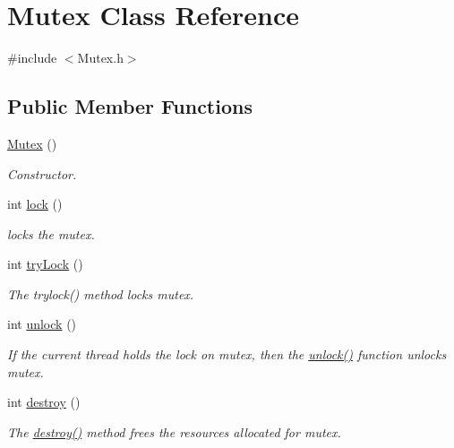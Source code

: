 \hypertarget{class_mutex}{
\section{\-Mutex \-Class \-Reference}
\label{class_mutex}
}


{\ttfamily \#include $<$\-Mutex.\-h$>$}

\subsection*{\-Public \-Member \-Functions}
\begin{DoxyCompactItemize}
\item 
\hyperlink{class_mutex_a593423d868daf926c7b0d63a833ae29a}{\-Mutex} ()
\begin{DoxyCompactList}\small\item\em \-Constructor. \end{DoxyCompactList}\item 
int \hyperlink{class_mutex_ab779f47fd979c9645703b2110ad48a6b}{lock} ()
\begin{DoxyCompactList}\small\item\em locks the mutex. \end{DoxyCompactList}\item 
int \hyperlink{class_mutex_ae259095f6fdebcc45fc85c6f4d52da5a}{try\-Lock} ()
\begin{DoxyCompactList}\small\item\em \-The trylock() method locks mutex. \end{DoxyCompactList}\item 
int \hyperlink{class_mutex_a73ffa1b2f7fef95563bdb83fed8e57ee}{unlock} ()
\begin{DoxyCompactList}\small\item\em \-If the current thread holds the lock on mutex, then the \hyperlink{class_mutex_a73ffa1b2f7fef95563bdb83fed8e57ee}{unlock()} function unlocks mutex. \end{DoxyCompactList}\item 
int \hyperlink{class_mutex_a28466fe885b8458cdf152a81214d2398}{destroy} ()
\begin{DoxyCompactList}\small\item\em \-The \hyperlink{class_mutex_a28466fe885b8458cdf152a81214d2398}{destroy()} method frees the resources allocated for mutex. \end{DoxyCompactList}\end{DoxyCompactItemize}


